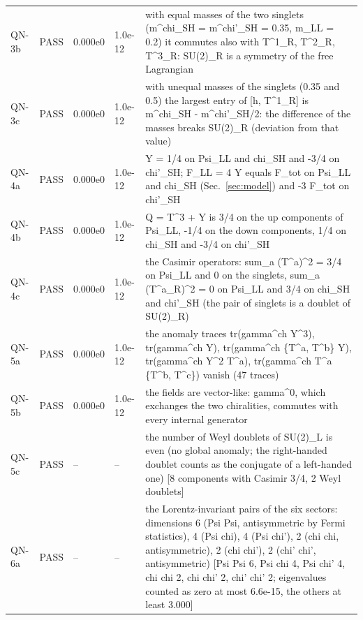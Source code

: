 \documentclass[aps,prd,onecolumn,superscriptaddress,nofootinbib,floatfix,longbibliography]{revtex4-2}
\begin{document}
\begin{longtable}{p{}p{}p{}p{}p{}}
QN-3b & PASS & 0.000e0 & 1.0e-12 & with equal masses of the two singlets (m\textasciicircum{}chi\_SH = m\textasciicircum{}chi'\_SH = 0.35, m\_LL = 0.2) it commutes also with T\textasciicircum{}1\_R, T\textasciicircum{}2\_R, T\textasciicircum{}3\_R: SU(2)\_R is a symmetry of the free Lagrangian \\
QN-3c & PASS & 0.000e0 & 1.0e-12 & with unequal masses of the singlets (0.35 and 0.5) the largest entry of [h, T\textasciicircum{}1\_R] is \textbar{}m\textasciicircum{}chi\_SH - m\textasciicircum{}chi'\_SH\textbar{}/2: the difference of the masses breaks SU(2)\_R (deviation from that value) \\
QN-4a & PASS & 0.000e0 & 1.0e-12 & Y = 1/4 on Psi\_LL and chi\_SH and -3/4 on chi'\_SH; F\_LL = 4 Y equals F\_tot on Psi\_LL and chi\_SH (Sec.~\ref{sec:model}) and -3 F\_tot on chi'\_SH \\
QN-4b & PASS & 0.000e0 & 1.0e-12 & Q = T\textasciicircum{}3 + Y is 3/4 on the up components of Psi\_LL, -1/4 on the down components, 1/4 on chi\_SH and -3/4 on chi'\_SH \\
QN-4c & PASS & 0.000e0 & 1.0e-12 & the Casimir operators: sum\_a (T\textasciicircum{}a)\textasciicircum{}2 = 3/4 on Psi\_LL and 0 on the singlets, sum\_a (T\textasciicircum{}a\_R)\textasciicircum{}2 = 0 on Psi\_LL and 3/4 on chi\_SH and chi'\_SH (the pair of singlets is a doublet of SU(2)\_R) \\
QN-5a & PASS & 0.000e0 & 1.0e-12 & the anomaly traces tr(gamma\textasciicircum{}ch Y\textasciicircum{}3), tr(gamma\textasciicircum{}ch Y), tr(gamma\textasciicircum{}ch \{T\textasciicircum{}a, T\textasciicircum{}b\} Y), tr(gamma\textasciicircum{}ch Y\textasciicircum{}2 T\textasciicircum{}a), tr(gamma\textasciicircum{}ch T\textasciicircum{}a \{T\textasciicircum{}b, T\textasciicircum{}c\}) vanish (47 traces) \\
QN-5b & PASS & 0.000e0 & 1.0e-12 & the fields are vector-like: gamma\textasciicircum{}0, which exchanges the two chiralities, commutes with every internal generator \\
QN-5c & PASS & -- & -- & the number of Weyl doublets of SU(2)\_L is even (no global anomaly; the right-handed doublet counts as the conjugate of a left-handed one) [8 components with Casimir 3/4, 2 Weyl doublets] \\
QN-6a & PASS & -- & -- & the Lorentz-invariant pairs of the six sectors: dimensions 6 (Psi Psi, antisymmetric by Fermi statistics), 4 (Psi chi), 4 (Psi chi'), 2 (chi chi, antisymmetric), 2 (chi chi'), 2 (chi' chi', antisymmetric) [Psi Psi 6, Psi chi 4, Psi chi' 4, chi chi 2, chi chi' 2, chi' chi' 2; eigenvalues counted as zero at most 6.6e-15, the others at least 3.000] \\

\end{longtable}
\end{document}
